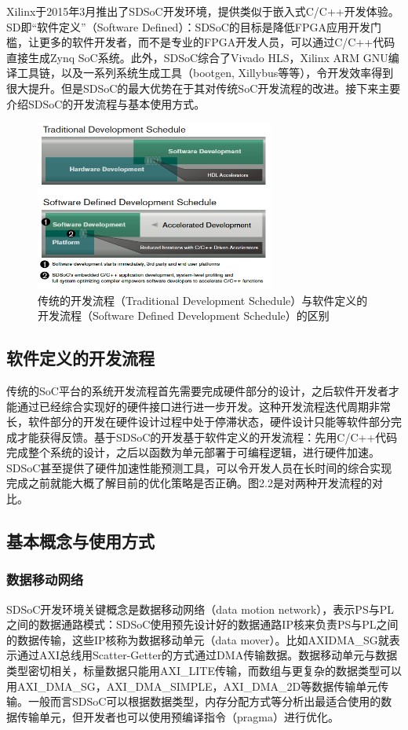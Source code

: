 Xilinx于2015年3月推出了SDSoC开发环境，提供类似于嵌入式C/C++开发体验。SD即“软件定义”（Software Defined）：SDSoC的目标是降低FPGA应用开发门槛，让更多的软件开发者，而不是专业的FPGA开发人员，可以通过C/C++代码直接生成Zynq SoC系统。此外，SDSoC综合了Vivado HLS，Xilinx ARM GNU编译工具链，以及一系列系统生成工具（bootgen, Xillybus等等），令开发效率得到很大提升。但是SDSoC的最大优势在于其对传统SoC开发流程的改进。接下来主要介绍SDSoC的开发流程与基本使用方式。

\begin{figure}[!ht]
\centering
	\includegraphics[width=0.7\textwidth]{assets/imgs/software-defined}
\caption{传统的开发流程（Traditional Development Schedule）与软件定义的开发流程（Software Defined Development Schedule）的区别}
\end{figure}

\subsection{软件定义的开发流程}

传统的SoC平台的系统开发流程首先需要完成硬件部分的设计，之后软件开发者才能通过已经综合实现好的硬件接口进行进一步开发。这种开发流程迭代周期非常长，软件部分的开发在硬件设计过程中处于停滞状态，硬件设计只能等软件部分完成才能获得反馈。基于SDSoC的开发基于软件定义的开发流程：先用C/C++代码完成整个系统的设计，之后以函数为单元部署于可编程逻辑，进行硬件加速。SDSoC甚至提供了硬件加速性能预测工具，可以令开发人员在长时间的综合实现完成之前就能大概了解目前的优化策略是否正确。图2.2是对两种开发流程的对比。

\subsection{基本概念与使用方式}

\subsubsection{数据移动网络}
SDSoC开发环境关键概念是数据移动网络（data motion network），表示PS与PL之间的数据通路模式：SDSoC使用预先设计好的数据通路IP核来负责PS与PL之间的数据传输，这些IP核称为数据移动单元（data mover）。比如AXIDMA\_SG就表示通过AXI总线用Scatter-Getter的方式通过DMA传输数据。数据移动单元与数据类型密切相关，标量数据只能用AXI\_LITE传输，而数组与更复杂的数据类型可以用AXI\_DMA\_SG，AXI\_DMA\_SIMPLE，AXI\_DMA\_2D等数据传输单元传输。一般而言SDSoC可以根据数据类型，内存分配方式等分析出最适合使用的数据传输单元，但开发者也可以使用预编译指令（pragma）进行优化。


